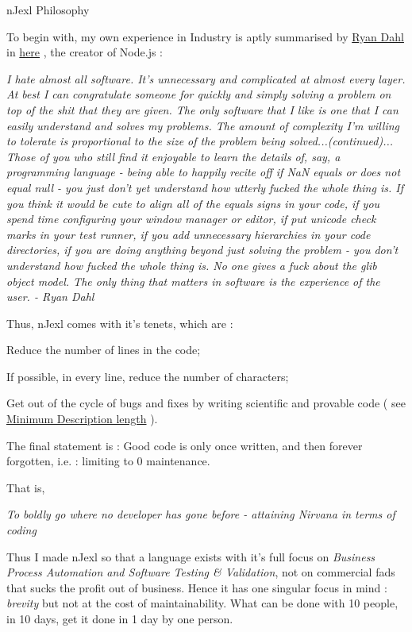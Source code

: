 \begin{section}{nJexl Philosophy}

To begin with, my own experience in Industry is aptly summarised by \href{https://en.wikipedia.org/wiki/Node.js}{Ryan Dahl}
in \href{http://harmful.cat-v.org/software/node.js}{here} , the creator of Node.js :

\begin{center}
\emph{
I hate almost all software. It's unnecessary and complicated at almost every layer. At best I can congratulate someone for quickly and simply solving a problem on top of the shit that they are given. The only software that I like is one that I can easily understand and solves my problems. The amount of complexity I'm willing to tolerate is proportional to the size of the problem being solved...(continued)...
Those of you who still find it enjoyable to learn the details of, say, a programming language - being able to happily recite off if NaN equals or does not equal null - you just don't yet understand how utterly fucked the whole thing is. If you think it would be cute to align all of the equals signs in your code, if you spend time configuring your window manager or editor, if put unicode check marks in your test runner, if you add unnecessary hierarchies in your code directories, if you are doing anything beyond just solving the problem - you don't understand how fucked the whole thing is. No one gives a fuck about the glib object model.
\emph{The only thing that matters in software is the experience of the user.}   - Ryan Dahl
}
\end{center}

Thus, nJexl comes with it's tenets, which are :

\begin{enumerate}
\item{ Reduce the number of lines in the code; }
\item{ If possible, in every line, reduce the number of characters; }
\item{ Get out of the cycle of bugs and fixes by writing scientific and provable code 
    ( see  \href{http://en.wikipedia.org/wiki/Minimum_description_length}{Minimum Description length} ).
\item{The final statement is : Good code is only once written, and then forever forgotten, i.e. : limiting to 0 maintenance. }    
} 
\end{enumerate}
That is, 
\begin{center}
     \emph{To boldly go where no developer has gone before - attaining Nirvana in terms of coding}
\end{center}     
Thus I made nJexl so that a language exists with it's full focus on \emph{Business Process Automation and Software Testing \& Validation},
not on commercial fads that sucks the profit out of business. Hence it has one singular focus in mind : \emph{brevity} but not at the cost of maintainability. What can be done with 10 people, in 10 days, get it done in 1 day by one person.

\end{section}

